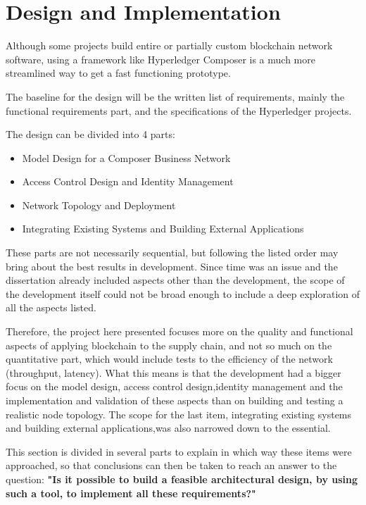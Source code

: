 \section{Design and Implementation}

Although some projects build entire or partially custom blockchain network software, using a framework like Hyperledger Composer is a much more streamlined way to get a fast functioning prototype.

The baseline for the design will be the written list of requirements, mainly the functional requirements part, and the specifications of the Hyperledger projects.

The design can be divided into 4 parts:
\begin{itemize}
    \item Model Design for a Composer Business Network
    \item Access Control Design and Identity Management
    \item Network Topology and Deployment
    \item Integrating Existing Systems and Building External Applications
\end{itemize}

These parts are not necessarily sequential, but following the listed order may bring about the best results in development. Since time was an issue and the dissertation already included aspects other than the development, the scope of the development itself could not be broad enough to include a deep exploration of all the aspects listed.

Therefore, the project here presented focuses more on the quality and functional aspects of applying blockchain to the supply chain, and not so much on the quantitative part, which would include tests to the efficiency of the network (throughput, latency). What this means is that the development had a bigger focus on the model design, access control design,identity management and the implementation and validation of these aspects than on building and testing a realistic node topology. The scope for the last item, integrating existing systems and building external applications,was also narrowed down to the essential.

This section is divided in several parts to explain in which way these items were approached, so that conclusions can then be taken to reach an answer to the question: \textbf{"Is it possible to build a feasible architectural design, by using such a tool, to implement all these requirements?"}


